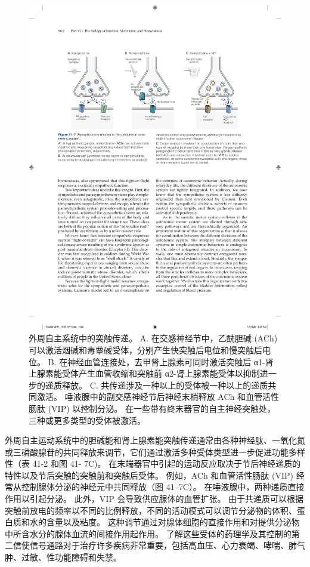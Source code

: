 \begin{figure}[htbp]
	\centering
	\includegraphics[width=0.8\linewidth]{chap41/fig_41_7}
	\caption{外周自主系统中的突触传递。 A. 在交感神经节中，乙酰胆碱 (ACh) 可以激活烟碱和毒蕈碱受体，分别产生快突触后电位和慢突触后电位。 B. 在神经血管连接处，去甲肾上腺素可同时激活突触后 α1-肾上腺素能受体产生血管收缩和突触前 α2-肾上腺素能受体以抑制进一步的递质释放。 C. 共传递涉及一种以上的受体被一种以上的递质共同激活。 唾液腺中的副交感神经节后神经末梢释放 ACh 和血管活性肠肽 (VIP) 以控制分泌。 在一些带有终末器官的自主神经突触处，三种或更多类型的受体被激活。}
	\label{fig:41_7}
\end{figure}


外周自主运动系统中的胆碱能和肾上腺素能突触传递通常由各种神经肽、一氧化氮或三磷酸腺苷的共同释放来调节，它们通过激活多种受体类型进一步促进功能多样性（表 41-2 和图 41- 7C)。
在末端器官中引起的运动反应取决于节后神经递质的特性以及节后突触的突触前和突触后受体。
例如，ACh 和血管活性肠肽 (VIP) 经常从控制腺体分泌的神经元中共同释放（图 41–7C）。
在唾液腺中，两种递质直接作用以引起分泌。
此外，VIP 会导致供应腺体的血管扩张。
由于共递质可以根据突触前放电的频率以不同的比例释放，不同的活动模式可以调节分泌物的体积、蛋白质和水的含量以及粘度。
这种调节通过对腺体细胞的直接作用和对提供分泌物中所含水分的腺体血流的间接作用起作用。
了解这些受体的药理学及其控制的第二信使信号通路对于治疗许多疾病非常重要，包括高血压、心力衰竭、哮喘、肺气肿、过敏、性功能障碍和失禁。



